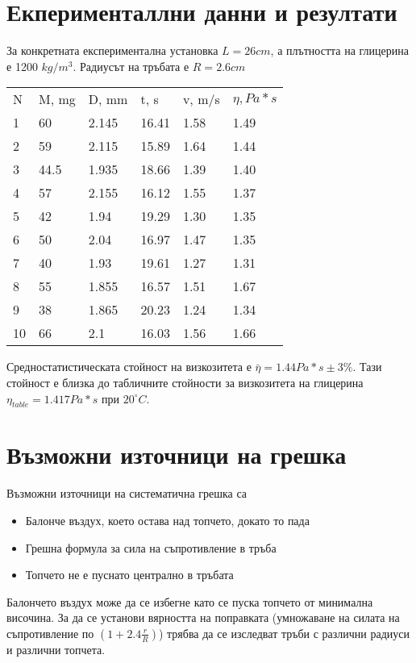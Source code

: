 \documentclass[aps, prb, twocolumn, a4paper]{revtex4-2}
\begin{document}
\section{Екперименталлни данни и резултати}
За конкретната експериментална установка $L=26cm$, а плътността на глицерина е 1200 $kg/m^3$. Радиусът на тръбата е $R=2.6 cm$ 

\begin{table}[ht]
\begin{tabular}{llllll}
    N  & M, mg & D, mm & t, s  & v, m/s & $\eta, Pa*s$\\
1  & 60    & 2.145 & 16.41 & 1.58   & 1.49                          \\
2  & 59    & 2.115 & 15.89 & 1.64   & 1.44                          \\
3  & 44.5  & 1.935 & 18.66 & 1.39   & 1.40                          \\
4  & 57    & 2.155 & 16.12 & 1.55   & 1.37                          \\
5  & 42    & 1.94  & 19.29 & 1.30   & 1.35                          \\
6  & 50    & 2.04  & 16.97 & 1.47   & 1.35                          \\
7  & 40    & 1.93  & 19.61 & 1.27   & 1.31                          \\
8  & 55    & 1.855 & 16.57 & 1.51   & 1.67                          \\
9  & 38    & 1.865 & 20.23 & 1.24   & 1.34                          \\
10 & 66    & 2.1   & 16.03 & 1.56   & 1.66                     
\end{tabular}
\end{table}
Средностатистическата стойност на визкозитета е $\bar{\eta}=1.44 Pa*s\pm 3\% $. Тази стойност е близка до табличните стойности за визкозитета на глицерина $\eta_{table} = 1.417 Pa*s$ при $20^\circ C$. 

\section{Възможни източници на грешка}
Възможни източници на систематична грешка са
\begin{itemize}
    \item Балонче въздух, което остава над топчето, докато то пада
    \item Грешна формула за сила на съпротивление в тръба 
    \item Топчето не е пуснато централно в тръбата
\end{itemize}
Балончето въздух може да се избегне като се пуска топчето от минимална височина. За да се установи вярността на поправката (умножаване на силата на съпротивление по $(1+2.4\frac{r}{R})$) трябва да се изследват тръби с различни радиуси и различни топчета.
\end{document}
